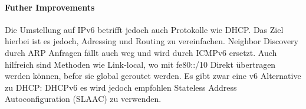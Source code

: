 			\paragraph{Futher Improvements}
				Die Umstellung auf IPv6 betrifft jedoch auch Protokolle wie DHCP. Das Ziel hierbei ist es jedoch, Adressing und Routing zu vereinfachen. Neighbor Discovery durch ARP Anfragen fällt auch weg und wird durch ICMPv6 ersetzt. Auch hilfreich sind Methoden wie Link-local, wo mit fe80::/10 Direkt übertragen werden können, befor sie global geroutet werden. Es gibt zwar eine v6 Alternative zu DHCP: DHCPv6 es wird jedoch empfohlen Stateless Address Autoconfiguration (SLAAC) zu verwenden.


